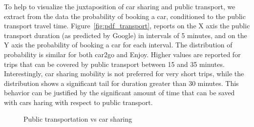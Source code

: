 To help to visualize the juxtaposition of car sharing and public transport, we extract from the data the probability of booking a car, conditioned to the public transport travel time.
Figure~\ref{fig:pdf_transport}, reports on the X axis the public transport duration (as predicted by Google) in intervals of 5 minutes, and on the Y axis the probability of booking a car for each interval.
The distribution of probability is similar for both car2go and Enjoy. Higher values are reported for trips that can be covered by public transport between 15 and 35 minutes. Interestingly, car sharing mobility is not preferred for very short trips, while the distribution shows a significant tail for duration greater than 30 minutes. This behavior can be justified by the significant amount of time that can be saved with cars haring with respect to public transport.


  
  \begin{figure}[t!]
  \centering     %
  \caption{Public transportation vs car sharing \label{fig:public_transport}}
  \end{figure}
  
  
 
